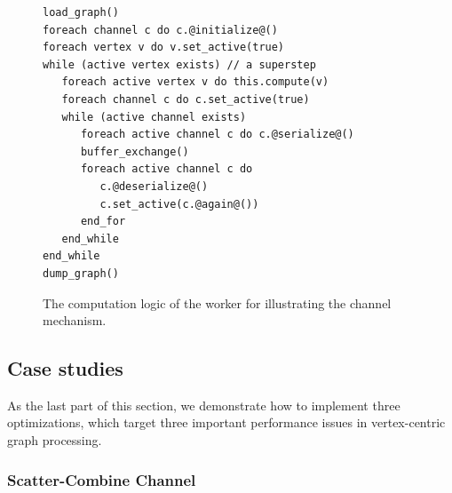\documentclass{sokendai_thesis} %
\begin{document}

\begin{figure}[t]
\begin{lstlisting}[style=highlight,
morekeywords={foreach,end_for,end_while}]
load_graph()
foreach channel c do c.@initialize@()
foreach vertex v do v.set_active(true)
while (active vertex exists) // a superstep
   foreach active vertex v do this.compute(v)
   foreach channel c do c.set_active(true)
   while (active channel exists)
      foreach active channel c do c.@serialize@()
      buffer_exchange()
      foreach active channel c do
         c.@deserialize@()
         c.set_active(c.@again@())
      end_for
   end_while
end_while
dump_graph()
\end{lstlisting}
\caption{The computation logic of the worker for illustrating the channel mechanism.}
\label{fig:channel-logic}
\end{figure}

\subsection{Case studies}

As the last part of this section, we demonstrate how to implement three optimizations, which target three important performance issues in vertex-centric graph processing.

\subsubsection{Scatter-Combine Channel}
\label{sec:scatter-combine}
\end{document}
